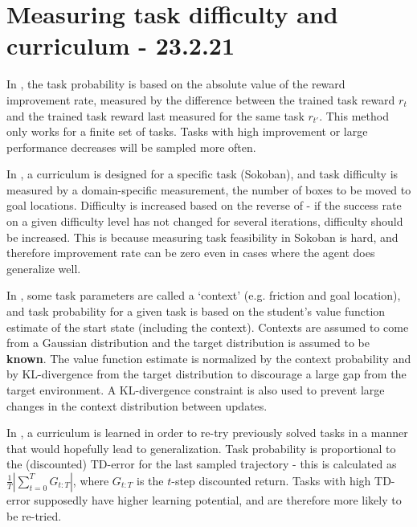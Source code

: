 \documentclass[letterpaper]{article}
\theoremstyle{definition}
\begin{document}
\section{Measuring task difficulty and curriculum - 23.2.21} \label{sec:difficulty}

In \cite{Matiisen2020}, the task probability is based on the absolute value of the reward improvement rate, measured by the difference between the trained task reward $r_t$ and the trained task reward last measured for the same task $r_{t'}$.
This method only works for a finite set of tasks. Tasks with high improvement or large performance decreases will be sampled more often.

In \cite{Feng2020}, a curriculum is designed for a specific task (Sokoban), and task difficulty is measured by a domain-specific measurement, the number of boxes to be moved to goal locations. Difficulty is increased based on the reverse of \cite{Matiisen2020} - if the success rate on a given difficulty level has not changed for several iterations, difficulty should be increased. This is because measuring task feasibility in Sokoban is hard, and therefore improvement rate can be zero even in cases where the agent does generalize well.

In \cite{Klink2020}, some task parameters are called a `context' (e.g. friction and goal location), and task probability for a given task is based on the student's value function estimate of the start state (including the context).
Contexts are assumed to come from a Gaussian distribution and the target distribution is assumed to be \textbf{known}.
The value function estimate is normalized by the context probability and by KL-divergence from the target distribution to discourage a large gap from the target environment. A KL-divergence constraint is also used to prevent large changes in the context distribution between updates.

In \cite{Jiang2020}, a curriculum is learned in order to re-try previously solved tasks in a manner that would hopefully lead to generalization. Task probability is proportional to the (discounted) TD-error for the last sampled trajectory - this is calculated as $ \frac{1}{T} | \sum_{t=0}^{T} {G_{t:T}}|$, where $G_{t:T}$ is the $t$-step discounted return. Tasks with high TD-error supposedly have higher learning potential, and are therefore more likely to be re-tried. 
\end{document}
